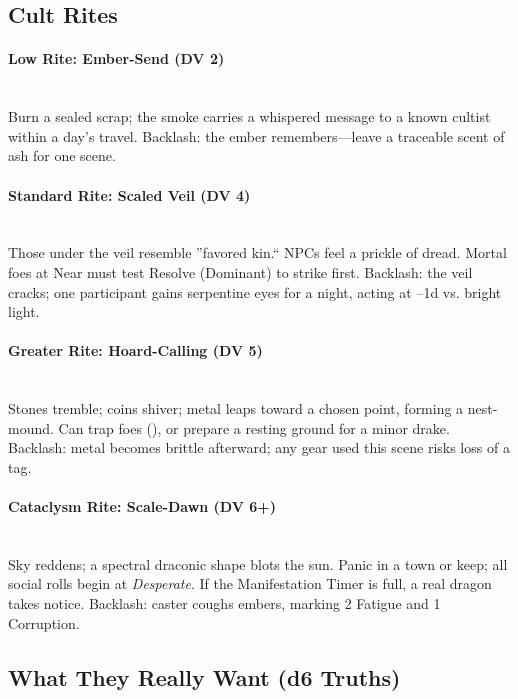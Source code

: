 \documentclass[11pt,letterpaper]{article}
\begin{document}
\subsection{Cult Rites}

\paragraph{Low Rite: Ember-Send (DV 2)}  \\
Burn a sealed scrap; the smoke carries a whispered message to a known cultist within a day's travel. Backlash: the ember remembers---leave a traceable scent of ash for one scene.

\paragraph{Standard Rite: Scaled Veil (DV 4)}  \\
Those under the veil resemble ''favored kin.`` NPCs feel a prickle of dread. Mortal foes at Near must test Resolve (Dominant) to strike first. Backlash: the veil cracks; one participant gains serpentine eyes for a night, acting at --1d vs. bright light.

\paragraph{Greater Rite: Hoard-Calling (DV 5)}   \\
Stones tremble; coins shiver; metal leaps toward a chosen point, forming a nest-mound. Can trap foes (), or prepare a resting ground for a minor drake. Backlash: metal becomes brittle afterward; any gear used this scene risks loss of a tag.

\paragraph{Cataclysm Rite: Scale-Dawn (DV 6+)}    \\
Sky reddens; a spectral draconic shape blots the sun. Panic in a town or keep; all social rolls begin at \textit{Desperate}. If the Manifestation Timer is full, a real dragon takes notice. Backlash: caster coughs embers, marking 2 Fatigue and 1 Corruption.

\subsection{What They Really Want (d6 Truths)}
\end{document}
